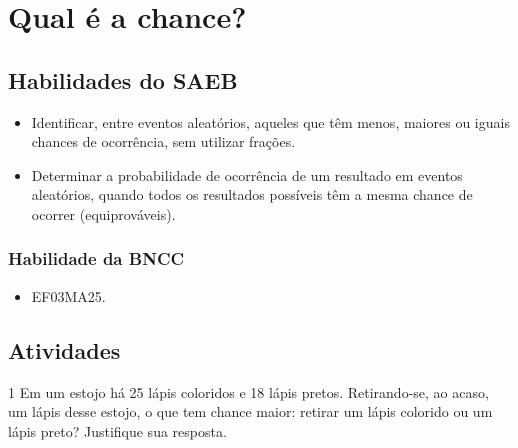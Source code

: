 \chapter{Qual é a chance?}

\section*{Habilidades do SAEB}

\begin{itemize}
\item Identificar, entre eventos aleatórios, aqueles que têm menos, maiores ou
iguais chances de ocorrência, sem utilizar frações.

\item Determinar a probabilidade de ocorrência de um resultado em eventos
aleatórios, quando todos os resultados possíveis têm a mesma chance de
ocorrer (equiprováveis).
\end{itemize}

\subsection{Habilidade da BNCC}

\begin{itemize}
  \item 
 EF03MA25.
\end{itemize}


\pagebreak 

\section*{Atividades}

\num{1} Em um estojo há 25 lápis coloridos e 18 lápis pretos. Retirando-se, ao
acaso, um lápis desse estojo, o que tem chance maior: retirar um lápis
colorido ou um lápis preto? Justifique sua resposta.

